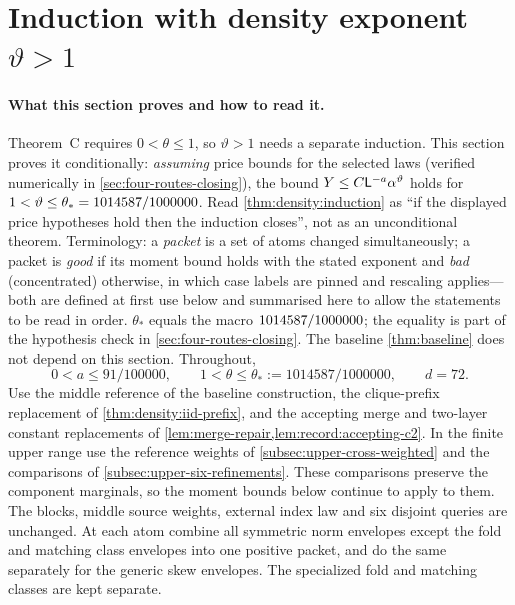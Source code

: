 \section{Induction with density exponent \texorpdfstring{$\vartheta>1$}{vartheta>1}}\label{sec:density-upgrade}

\paragraph{What this section proves and how to read it.}
Theorem~C requires $0<\theta\le1$, so $\vartheta>1$ needs a separate
induction. This section proves it conditionally: \emph{assuming}
price bounds for the selected laws (verified numerically in
\cref{sec:four-routes-closing}), the bound
$Y\le C\mathsf L^{-a}\alpha^{\vartheta}$ holds for
$1<\vartheta\le\theta_*=1014587/1000000$. Read
\cref{thm:density:induction} as ``if the displayed price hypotheses
hold then the induction closes'', not as an unconditional theorem.
Terminology: a \emph{packet} is a set of atoms changed
simultaneously; a packet is \emph{good} if its moment bound holds
with the stated exponent and \emph{bad} (concentrated) otherwise,
in which case labels are pinned and rescaling applies---both are
defined at first use below and summarised here to allow the
statements to be read in order. $\theta_*$ equals the macro
$1014587/1000000$; the equality is part of the hypothesis check
in \cref{sec:four-routes-closing}. The baseline
\cref{thm:baseline} does not depend on this section. Throughout,
\begin{equation}\label{eq:density:parameter-range}
 0<a\le91/100000,\qquad
 1<\theta\le\theta_*:=1014587/1000000,\qquad d=72.
\end{equation}
Use the middle reference of the baseline construction, the clique-prefix
replacement of \cref{thm:density:iid-prefix}, and the accepting merge and
two-layer constant replacements of
\cref{lem:merge-repair,lem:record:accepting-c2}. In the finite upper range
use the reference weights of \cref{subsec:upper-cross-weighted} and
the comparisons of \cref{subsec:upper-six-refinements}. These
comparisons preserve the component marginals, so the moment bounds
below continue to apply to them.
The blocks, middle source weights, external index law and six disjoint
queries are unchanged. At each atom
combine all symmetric norm envelopes except the fold and matching class envelopes into one positive packet,
and do the same separately for the generic skew envelopes. The
specialized fold and matching classes are kept separate.

